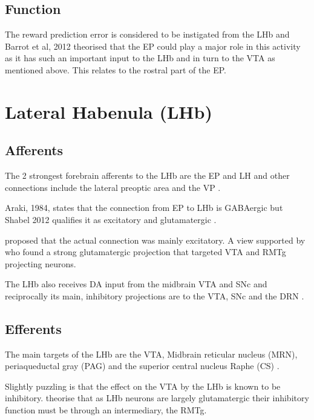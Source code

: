 \documentclass[12pt,a4paper]{article}
\begin{document}
\subsection{Function}

The reward prediction error is considered to be instigated from the
LHb and Barrot et al, 2012 theorised that the EP could play a major
role in this activity as it has such an important input to the LHb
\citep{Barrot2012} and in turn to the VTA as mentioned above. This
relates to the rostral part of the EP.







\section{Lateral Habenula (LHb)}

\subsection{Afferents}
The 2 strongest forebrain afferents to the LHb are the EP and LH and
other connections include the lateral preoptic area and the VP
\citep{Parent1981}.

Araki, 1984, states that the connection from EP to LHb is GABAergic
\citep{Araki1984} but Shabel 2012 qualifies it as excitatory and
glutamatergic \citep{Shabel2012}.

\citet{Mok1974} proposed that the actual connection was mainly excitatory.
A view supported by \citet{Poller2013} who found a strong
glutamatergic projection that targeted VTA and RMTg projecting neurons.

The LHb also receives DA input from the midbrain VTA and SNc
\citep{Kowski2009} and reciprocally its main, inhibitory projections
are to the VTA, SNc and the DRN
\citep{Ji2007, Christoph1986, Rajakumar1993}.

\subsection{Efferents}
The main targets of the LHb are the VTA, Midbrain reticular nucleus
(MRN), periaqueductal gray (PAG) and the superior central nucleus
Raphe (CS) \citep{Quina2015}.

Slightly puzzling is that the effect on the VTA by the LHb is known to
be inhibitory. \citet{Hong2011} theorise that as LHb neurons are
largely glutamatergic their inhibitory function must be through an
intermediary, the RMTg.
\end{document}
